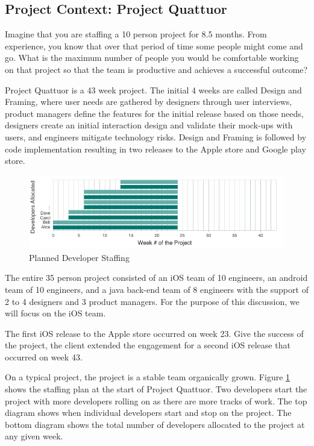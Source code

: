 \subsection{Project Context: Project Quattuor}
\label{ExampleInAction}
Imagine that you are staffing a 10 person project for 8.5 months. From experience, you know that over that period of time some people might come and go. What is the maximum number of people you would be comfortable working on that project so that the team is productive and achieves a successful outcome?  

Project Quattuor is a 43 week project. The initial 4 weeks are called Design and Framing, where user needs are gathered by designers through user interviews, product managers define the features for the initial release based on those needs, designers create an initial interaction design and validate their mock-ups with users, and engineers mitigate technology risks. Design and Framing is followed by code implementation resulting in two releases to the Apple store and Google play store.

\begin{figure}[t]
\centering
\includegraphics[width=7.1in]{OriginalDeveloperStaffingV2.jpg}
\caption{Planned Developer Staffing}
\label{PlannedDeveloperStaffing}
\end{figure}

The entire 35 person project consisted of an iOS team of 10 engineers, an android team of 10 engineers, and a java back-end team of 8 engineers with the support of 2 to 4 designers and 3 product managers. For the purpose of this discussion, we will focus on the iOS team. 

The first iOS release to the Apple store occurred on week 23. Give the success of the project, the client extended the engagement for a second iOS release that occurred on week 43. 

On a typical project, the project is a stable team organically grown. Figure \ref{PlannedDeveloperStaffing} shows the staffing plan at the start of Project Quattuor. Two developers start the project with more developers rolling on as there are more tracks of work. The top diagram shows when individual developers start and stop on the project. The bottom diagram shows the total number of developers allocated to the project at any given week. 

